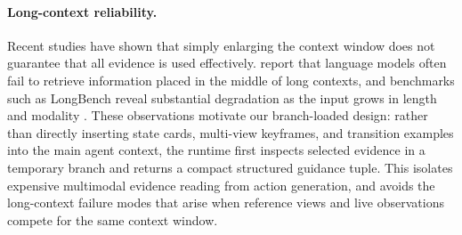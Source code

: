 \documentclass{llmxive}
\begin{document}
\paragraph{Long-context reliability.}
Recent studies have shown that simply enlarging the context window does not guarantee that all evidence is used effectively. \citet{liu2023lostmiddlelanguagemodels} report that language models often fail to retrieve information placed in the middle of long contexts, and benchmarks such as LongBench reveal substantial degradation as the input grows in length and modality \citep{bai2024longbenchbilingualmultitaskbenchmark}. These observations motivate our branch-loaded design: rather than directly inserting state cards, multi-view keyframes, and transition examples into the main agent context, the runtime first inspects selected evidence in a temporary branch and returns a compact structured guidance tuple. This isolates expensive multimodal evidence reading from action generation, and avoids the long-context failure modes that arise when reference views and live observations compete for the same context window.
\end{document}

